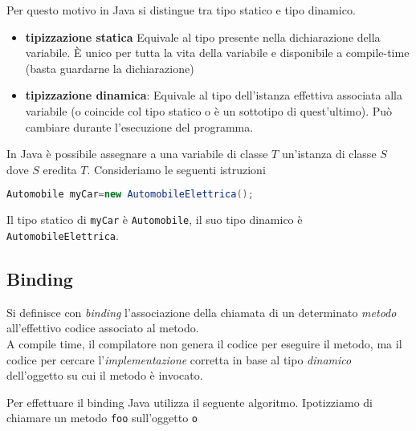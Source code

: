 \documentclass{article}
\begin{document}
Per questo motivo in Java si distingue tra tipo statico e tipo dinamico.
\begin{itemize}
	\item \textbf{tipizzazione statica} Equivale al tipo presente nella dichiarazione della variabile.
	È unico per tutta la vita della variabile e disponibile a compile-time (basta guardarne la dichiarazione)
	\item \textbf{tipizzazione dinamica}: Equivale al tipo dell'istanza effettiva associata alla variabile (o coincide col tipo statico o è un sottotipo di quest'ultimo).
	Può cambiare durante l'esecuzione del programma.
\end{itemize}

In Java è possibile assegnare a una variabile di classe $T$ un'istanza di classe $S$
dove $S$ eredita $T$. Consideriamo le seguenti istruzioni

\begin{lstlisting}[language=Java,escapechar=|]
Automobile myCar=new AutomobileElettrica();
\end{lstlisting}
Il tipo statico di \texttt{myCar} \`e \texttt{Automobile}, il suo tipo dinamico \`e \texttt{AutomobileElettrica}.






\subsection{Binding}

Si definisce con \emph{binding} l'associazione della chiamata di un determinato \emph{metodo} all'effettivo codice associato al metodo.\\

A compile time, il compilatore non genera il codice per eseguire il metodo, ma il codice per cercare l'\emph{implementazione} corretta in base al tipo \emph{dinamico} dell'oggetto su cui il metodo \`e invocato.

Per effettuare il binding Java utilizza il seguente algoritmo.
Ipotizziamo di chiamare un metodo \texttt{foo} sull'oggetto \texttt{o}
\end{document}
